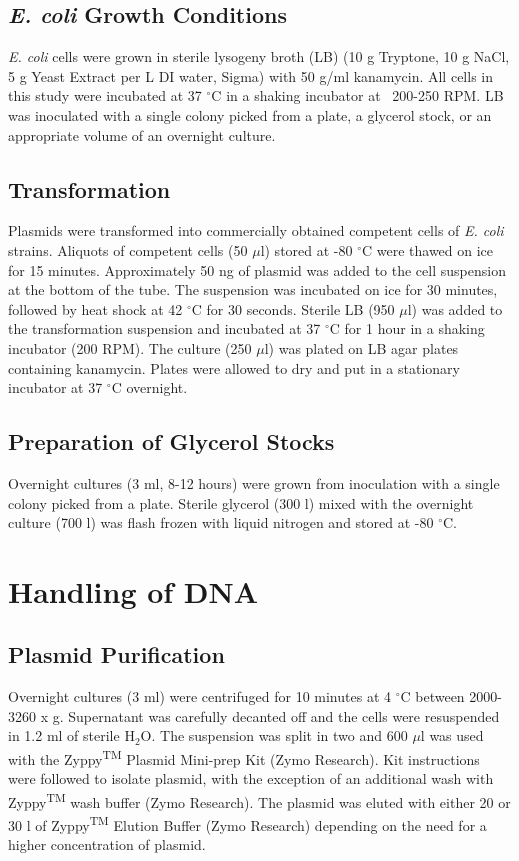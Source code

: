 \documentclass[12pt,twoside]{reedthesis}
\begin{document}
   \subsection{\textit{E. coli} Growth Conditions}
   \textit{E. coli} cells were grown in sterile lysogeny  broth (LB) (10 g Tryptone, 
   10 g NaCl, 5 g Yeast Extract per L DI water, Sigma) with 50 \micro g/ml kanamycin. All cells in this study were incubated at 37 $^\circ$C in a shaking incubator at ~200-250 RPM. LB was inoculated with a single colony picked from a plate, a glycerol stock, or an appropriate volume of an overnight culture. 
   
   \subsection{Transformation}
   Plasmids were transformed into commercially obtained competent cells of \textit{E. coli} strains. Aliquots of competent cells (50 $\mu$l) stored at -80 $^\circ$C were thawed on ice for 15 minutes. Approximately 50 ng of plasmid was added to the cell suspension at the bottom of the tube. The suspension was incubated on ice for 30 minutes, followed by heat shock at 42 $^\circ$C for 30 seconds. Sterile LB (950 $\mu$l) was added to the transformation suspension and incubated at 37 $^\circ$C for 1 hour in a shaking incubator (200 RPM). The culture (250 $\mu$l) was plated on LB agar plates containing kanamycin. Plates were allowed to dry and put in a stationary incubator at 37 $^\circ$C overnight. 
   
    \subsection{Preparation of Glycerol Stocks}
   Overnight cultures (3 ml, 8-12 hours) were grown from inoculation with a single colony picked from a plate. Sterile glycerol (300 \micro l) mixed with the overnight culture (700 \micro l) was flash frozen with liquid nitrogen and stored at -80 $^\circ$C. 
   
     \section{Handling of DNA }
   \subsection{Plasmid Purification}
   Overnight cultures (3 ml) were centrifuged for 10 minutes at 4 $^\circ$C between 2000-3260 x g. Supernatant was carefully decanted off and the cells were resuspended in 1.2 ml of sterile H$_{2}$O. The suspension was split in two and 600 $\mu$l was used with the Zyppy\textsuperscript{TM} Plasmid Mini-prep Kit (Zymo Research). Kit instructions were followed to isolate plasmid, with the exception of an additional wash with Zyppy\textsuperscript{TM} wash buffer (Zymo Research). The plasmid was eluted with either 20 or 30 \micro l of Zyppy\textsuperscript{TM} Elution Buffer (Zymo Research) depending on the need for a higher concentration of plasmid. 
   
\end{document}

